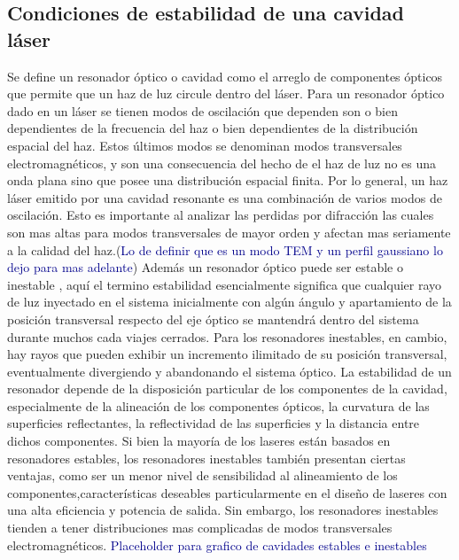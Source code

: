 \documentclass[10pt, a4paper]{article}%
\begin{document}
\begin{multicols}{2}
\subsection{Condiciones de estabilidad de una cavidad láser }
Se define un resonador óptico o cavidad como el arreglo de componentes ópticos que permite que un haz de luz circule dentro del láser. Para un resonador óptico dado en un láser se tienen modos de oscilación que dependen son o bien dependientes de la frecuencia del haz o bien dependientes de la distribución espacial del haz. Estos últimos modos se denominan modos transversales electromagnéticos, y son una consecuencia del hecho de el haz de luz no es una onda plana sino que posee una distribución espacial finita. Por lo general, un haz láser emitido por una cavidad resonante es una combinación de varios modos de oscilación. Esto es importante al analizar las perdidas por difracción las cuales son mas altas para modos transversales de mayor orden y afectan mas seriamente a la calidad del haz.(\textcolor{DarkBlue}{Lo de definir que es un modo TEM y un perfil gaussiano lo dejo para mas adelante}) Además un resonador óptico puede ser estable o inestable , aquí el termino estabilidad esencialmente significa que cualquier rayo de luz inyectado en el sistema inicialmente con algún ángulo y apartamiento de la posición transversal respecto del eje óptico se mantendrá dentro del sistema durante muchos cada viajes cerrados. Para los resonadores inestables, en cambio, hay rayos que pueden exhibir un incremento ilimitado de su posición transversal, eventualmente divergiendo y abandonando el sistema óptico. La estabilidad de un resonador depende de la disposición particular de los componentes de la cavidad, especialmente de la alineación de los componentes ópticos, la curvatura de las superficies reflectantes, la reflectividad de las superficies y la distancia entre dichos componentes. Si bien la mayoría de los laseres están basados en resonadores estables, los resonadores inestables también presentan ciertas ventajas, como ser un menor nivel de sensibilidad al alineamiento de los componentes,características deseables particularmente en el diseño de laseres con una alta eficiencia y potencia de salida. Sin embargo, los resonadores inestables tienden a tener distribuciones mas complicadas de modos transversales electromagnéticos.
\newline
\textcolor{DarkBlue}{Placeholder para grafico de cavidades estables e inestables}
\newline

\end{multicols}
\end{document}
